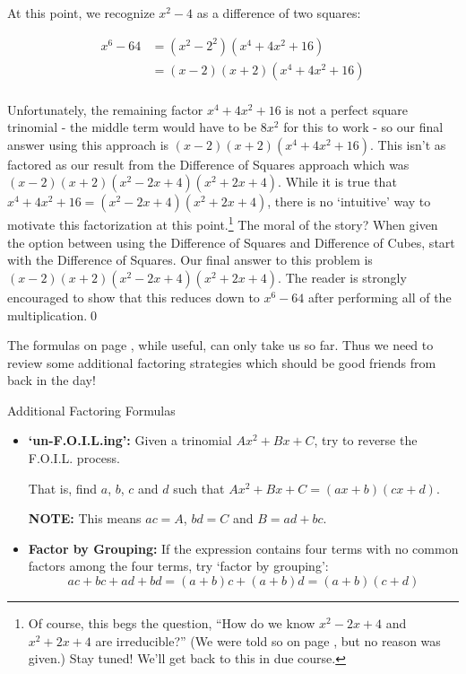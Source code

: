 \begin{ex}
\begin{enumerate}
At this point, we recognize $x^2 - 4$ as a difference of two squares:

\begin{align*}
x^6 - 64 & = (x^2 - 2^2)(x^4 + 4x^2 + 16)  \\
& = (x-2)(x+2)(x^4 + 4x^2 + 16) \tag{Difference of Squares, $a = x$, $b = 2$} \\ 
\end{align*}

Unfortunately, the remaining factor $x^4 + 4x^2 + 16$ is not a perfect square trinomial - the middle term would have to be $8x^2$ for this to work - so our final answer using this approach is $(x-2)(x+2)(x^4 + 4x^2 + 16)$.   This isn't as factored as our result from the Difference of Squares approach which was $(x-2)(x+2)(x^2-2x+4)(x^2+2x+4)$.  While it is true that $x^4 + 4x^2 + 16 = (x^2-2x+4)(x^2+2x+4)$, there is no `intuitive' way to motivate this factorization at this point.\footnote{Of course, this begs the question, ``How do we know $x^2-2x+4$ and $x^2+2x+4$ are irreducible?'' (We were told so on page \pageref{box:CommonFactoringFormulas}, but no reason was given.)  Stay tuned!  We'll get back to this in due course.}  The moral of the story?  When given the option between using the Difference of Squares and Difference of Cubes, start with the Difference of Squares.  Our final answer to this problem is  $(x-2)(x+2)(x^2-2x+4)(x^2+2x+4)$.  The reader is strongly encouraged to show that this reduces down to $x^6 - 64$ after performing all of the  multiplication.\qed

\end{enumerate}
\end{ex}

The formulas on page \pageref{box:CommonFactoringFormulas}, while useful, can only take us so far.  Thus we need to review some additional factoring strategies which should be good friends from back in the day!

\begin{floatbox}[label=box:AdvancedReviewFactoring]{Additional Factoring Formulas}

\begin{itemize}[leftmargin=*]

\item  \textbf{`un-F.O.I.L.ing':} Given a trinomial $Ax^2 + Bx + C$, try to reverse the F.O.I.L. process.  

That is, find  $a$, $b$, $c$ and $d$ such that $Ax^2 + Bx + C= (ax+b)(cx+d)$.  

\textbf{NOTE:}  This means $ac = A$, $bd = C$ and $B = ad+bc$.

\item \textbf{Factor by Grouping:} If the expression contains four terms with no common factors among the four terms, try `factor by grouping': \[ac + bc + ad + bd = (a +b)c + (a+b)d = (a+b)(c+d)\]

\end{itemize}

\end{floatbox}

